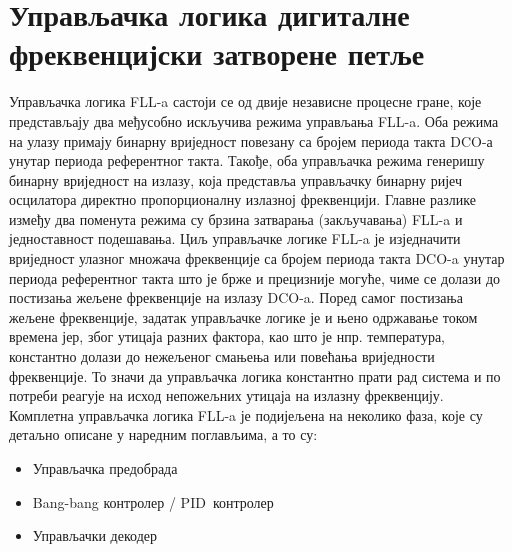 \documentclass[master]{finthesis}
\def \FLL  {FLL} %
\def \DCO  {DCO} %
\def \PID  {PID} %
\begin{document}
\section{Управљачка логика дигиталне фреквенцијски затворене петље}
Управљачка логика \FLL-a састоји се од двије независне процесне гране, које представљају два међусобно искључива режима управљања \FLL-a. Оба режима на улазу примају бинарну вриједност повезану са бројем периода такта \DCO-а унутар периода референтног такта. Такође, оба управљачка режима генеришу бинарну вриједност на излазу, која представља управљачку бинарну ријеч осцилатора директно пропорционалну излазној фреквенцији. Главне разлике између два поменута режима су брзина затварања (закључавања) \FLL-a и једноставност подешавања. Циљ управљачке логике \FLL-a је изједначити вриједност улазног множача фреквенције са бројем периода такта \DCO-a унутар периода референтног такта што је брже и прецизније могуће, чиме се долази до постизања жељене фреквенције на излазу \DCO-a. Поред самог постизања жељене фреквенције, задатак управљачке логике је и њено одржавање током времена јер, због утицаја разних фактора, као што је нпр. температура, константно долази до нежељеног смањења или повећања вриједности фреквенције. То значи да управљачка логика константно прати рад система и по потреби реагује на исход непожељних утицаја на излазну фреквенцију. Комплетна управљачка логика \FLL-a је подијељена на неколико фаза, које су детаљно описане у наредним поглављима, а то су:
\begin{itemize}
	\item Управљачка предобрада
	\item Bang-bang контролер / \PID\ контролер
	\item Управљачки декодер
\end{itemize}
\end{document}
